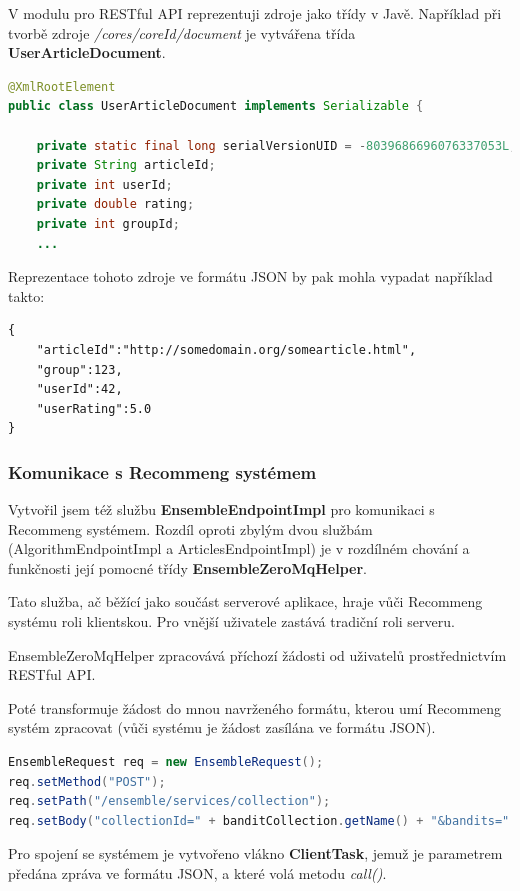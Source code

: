 \documentclass[thesis=M,czech]{FITthesis}[2014/05/07]
\begin{document}
V modulu pro RESTful API reprezentuji zdroje jako třídy v Javě. Například při tvorbě zdroje \emph{/cores/{coreId}/document} je vytvářena třída \textbf{UserArticleDocument}. 

\begin{lstlisting}[language=java]
@XmlRootElement
public class UserArticleDocument implements Serializable {       
    
    private static final long serialVersionUID = -8039686696076337053L;    
    private String articleId;
    private int userId;    
    private double rating;
    private int groupId;
    ...
\end{lstlisting}

Reprezentace tohoto zdroje ve formátu JSON by pak mohla vypadat například takto:

\begin{lstlisting}
{
    "articleId":"http://somedomain.org/somearticle.html",
    "group":123,
    "userId":42,
    "userRating":5.0
}
\end{lstlisting}

\subsubsection{Komunikace s Recommeng systémem}
\label{sec:restrec}
Vytvořil jsem též službu \textbf{EnsembleEndpointImpl} pro komunikaci s Recommeng systémem. Rozdíl oproti zbylým dvou službám (AlgorithmEndpointImpl a ArticlesEndpointImpl) je v rozdílném chování a funkčnosti její pomocné třídy \textbf{EnsembleZeroMqHelper}.

Tato služba, ač běžící jako součást serverové aplikace, hraje vůči Recommeng systému roli klientskou. Pro vnější uživatele zastává tradiční roli serveru.

EnsembleZeroMqHelper zpracovává příchozí žádosti od uživatelů prostřednictvím RESTful API.

Poté transformuje žádost do mnou navrženého formátu, kterou umí Recommeng systém zpracovat (vůči systému je žádost zasílána ve formátu JSON). 

\begin{lstlisting}[language=java]
EnsembleRequest req = new EnsembleRequest();
req.setMethod("POST");
req.setPath("/ensemble/services/collection");
req.setBody("collectionId=" + banditCollection.getName() + "&bandits=" + formatBanditIds(banditCollection.getBanditIds()));
\end{lstlisting}

Pro spojení se systémem je vytvořeno vlákno \textbf{ClientTask}, jemuž je parametrem předána zpráva ve formátu JSON, a které volá metodu \emph{call()}.
\end{document}
